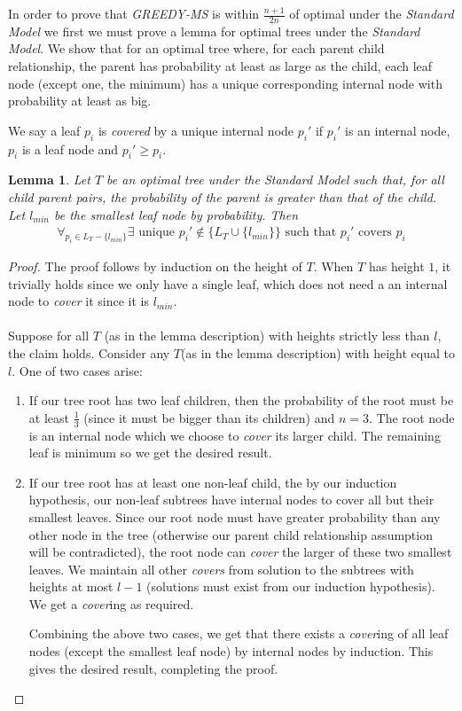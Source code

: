 \documentclass[letterpaper,12pt,titlepage,oneside,final]{book}
\theoremstyle{plain}
\newtheorem{lem}[thm]{Lemma}
\begin{document}
In order to prove that \textit{GREEDY-MS} is within $\frac{n+1}{2n}$ of optimal under the \textit{Standard Model}  we first we must prove a lemma for optimal trees under the \textit{Standard Model}. We show that for an optimal tree where, for each parent child relationship, the parent has probability at least as large as the child, each leaf node (except one, the minimum) has a unique corresponding internal node with probability at least as big.

We say a leaf $p_i$ is \textit{covered} by a unique internal node $p_i'$ if $p_i'$ is an internal node, $p_i$ is a leaf node and $p_i' \geq p_i$.

\begin{lem}\label{leavesCovered}
Let $T$ be an optimal tree under the \textit{Standard Model} such that, for all child parent pairs, the probability of the parent is greater than that of the child. Let $l_{min}$ be the smallest leaf node by probability. Then
\begin{align*}
\forall_{p_i \in L_T-\{l_{min}\}} \exists \text{ unique } p_i' \notin \{L_T \cup \{l_{min}\}\} \text{ such that } p_i' \text{ covers } p_i
\end{align*}
\end{lem}
\begin{proof}
The proof follows by induction on the height of $T$. When $T$ has height $1$, it trivially holds since we only have a single leaf, which does not need a an internal node to \textit{cover} it since it is $l_{min}$. \\~\\ 
Suppose for all $T$ (as in the lemma description) with heights strictly less than $l$, the claim holds. Consider any $T$(as in the lemma description) with height equal to $l$. One of two cases arise:

\begin{enumerate}
\item If our tree root has two leaf children, then the probability of the root must be at least $\frac{1}{3}$ (since it must be bigger than its children) and $n=3$. The root node is an internal node which we choose to \textit{cover} its larger child. The remaining leaf is minimum so we get the desired result.

\item If our tree root has at least one non-leaf child, the by our induction hypothesis, our non-leaf subtrees have internal nodes to cover all but their smallest leaves. Since our root node must have greater probability than any other node in the tree (otherwise our parent child relationship assumption will be contradicted), the root node can \textit{cover} the larger of these two smallest leaves. We maintain all other \textit{covers} from solution to the subtrees with heights at most $l-1$ (solutions must exist from our induction hypothesis). We get a \textit{cover}ing as required.


Combining the above two cases, we get that there exists a \textit{cover}ing of all leaf nodes (except the smallest leaf node) by internal nodes by induction. This gives the desired result, completing the proof.
\end{enumerate}
\end{proof}
\end{document}
